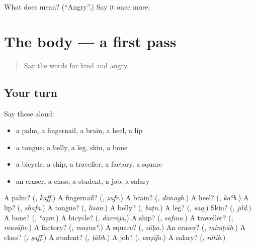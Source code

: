 \begin{tcolorbox}[breakable,colback=teal!4,colframe=teal!35!black,title={Before you move on}]
What does  mean? (\textquotedblleft{}Angry\textquotedblright{}.) Say it once more.
\end{tcolorbox}
\section[(dialogue)]{The body — a first pass}

\label{lesson:AR-R147-first-pass-the-body}



\begin{quote}
Say the words for kind and angry.
\end{quote}

\subsection*{Your turn}
Say these aloud:

\begin{itemize}
\raggedright
  \item a palm, a fingernail, a brain, a heel, a lip
  \item a tongue, a belly, a leg, skin, a bone
  \item a bicycle, a ship, a traveller, a factory, a square
  \item an eraser, a class, a student, a job, a salary
\end{itemize}

\begin{tcolorbox}[breakable,colback=teal!4,colframe=teal!35!black,title={Before you move on}]
A palm? (\textbf{}, \emph{kaff}.) A fingernail? (\textbf{}, \emph{ẓufr}.) A brain? (\textbf{}, \emph{dimāgh}.) A heel? (\textbf{}, \emph{kaʿb}.) A lip? (\textbf{}, \emph{shafa}.) A tongue? (\textbf{}, \emph{lisān}.) A belly? (\textbf{}, \emph{baṭn}.) A leg? (\textbf{}, \emph{sāq}.) Skin? (\textbf{}, \emph{jild}.) A bone? (\textbf{}, \emph{ʿaẓm}.) A bicycle? (\textbf{}, \emph{darrāja}.) A ship? (\textbf{}, \emph{safīna}.) A traveller? (\textbf{}, \emph{musāfir}.) A factory? (\textbf{}, \emph{maṣnaʿ}.) A square? (\textbf{}, \emph{sāḥa}.) An eraser? (\textbf{}, \emph{mimḥāh}.) A class? (\textbf{}, \emph{ṣaff}.) A student? (\textbf{}, \emph{ṭālib}.) A job? (\textbf{}, \emph{waẓīfa}.) A salary? (\textbf{}, \emph{rātib}.)
\end{tcolorbox}

